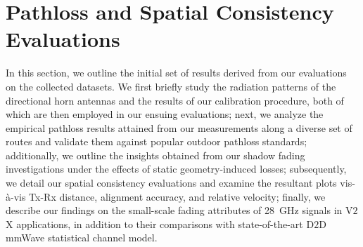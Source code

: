 \documentclass[12pt, draftcls, onecolumn]{IEEEtran}
\begin{document}
{%
\section{Pathloss and Spatial Consistency Evaluations}\label{S4}
In this section, we outline the initial set of results derived from our evaluations on the collected datasets. We first briefly study the radiation patterns of the directional horn antennas and the results of our calibration procedure, both of which are then employed in our ensuing evaluations; next, we analyze the empirical pathloss results attained from our measurements along a diverse set of routes and validate them against popular outdoor pathloss standards; additionally, we outline the insights obtained from our shadow fading investigations under the effects of static geometry-induced losses; subsequently, we detail our spatial consistency evaluations and examine the resultant plots vis-\`{a}-vis Tx-Rx distance, alignment accuracy, and relative velocity; finally, we describe our findings on the small-scale fading attributes of \SI{28}{\giga\hertz} signals in V$2$X applications, in addition to their comparisons with state-of-the-art D$2$D mmWave statistical channel model. 

}
\end{document}
